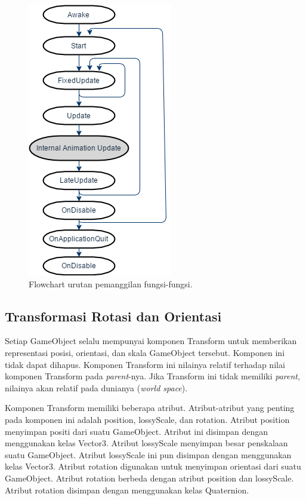 \begin{itemize}
    \begin{figure}[htbp]
    \centering
    \includegraphics[scale=0.6]{Gambar/unity-script-flowchart.png}
    \caption{Flowchart urutan pemanggilan fungsi-fungsi.} 
    \label{fig:flowchart_pemanggilan_fungsi}
    \end{figure}
    
\end{itemize}
 
 
\subsection{Transformasi Rotasi dan Orientasi}
\label{ssec:transformasi_rotasi_dan_orientasi}

 Setiap GameObject selalu mempunyai komponen Transform untuk memberikan representasi posisi, orientasi, dan skala GameObject tersebut. Komponen ini tidak dapat dihapus. Komponen Transform ini nilainya relatif terhadap nilai komponen Transform pada \textit{parent}-nya. Jika Transform ini tidak memiliki \textit{parent}, nilainya akan relatif pada dunianya (\textit{world space}). 
 
 Komponen Transform memiliki beberapa atribut. Atribut-atribut yang penting pada komponen ini adalah position, lossyScale, dan rotation. Atribut position menyimpan positi dari suatu GameObject. Atribut ini disimpan dengan menggunakan kelas Vector3. Atribut lossyScale menyimpan besar penskalaan suatu GameObject. Atribut lossyScale ini pun disimpan dengan menggunakan kelas Vector3. Atribut rotation digunakan untuk menyimpan orientasi dari suatu GameObject. Atribut rotation berbeda dengan atribut position dan lossyScale. Atribut rotation disimpan dengan menggunakan kelas Quaternion. 
 
